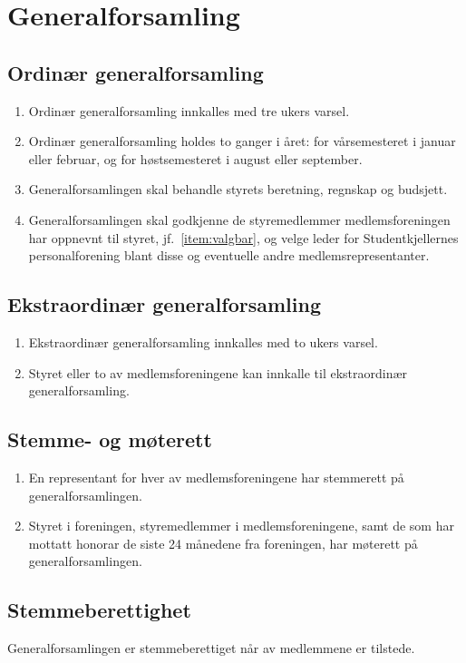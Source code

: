 \documentclass[11pt,norsk,a4paper]{article}
\begin{document}
\section{Generalforsamling}

\subsection{Ordinær generalforsamling}
\begin{enumerate}
	\item Ordinær generalforsamling innkalles med tre ukers varsel. 
	\item Ordinær generalforsamling holdes to ganger i året: for vårsemesteret i januar eller februar, og for høstsemesteret i august eller september.
	\item Generalforsamlingen skal behandle styrets beretning, regnskap og budsjett. 
	\item Generalforsamlingen skal godkjenne de styremedlemmer medlemsforeningen 
		har oppnevnt til styret, jf.~\ref{item:valgbar}, 
		og velge leder for Studentkjellernes personalforening blant disse og eventuelle andre medlemsrepresentanter.
\end{enumerate}

\subsection{Ekstraordinær generalforsamling}
\begin{enumerate}
	\item Ekstraordinær generalforsamling innkalles med to ukers varsel. 
	\item Styret eller to av medlemsforeningene kan innkalle til ekstraordinær generalforsamling.
\end{enumerate}

\subsection{Stemme- og møterett}
\begin{enumerate}
	\item En representant for hver av medlemsforeningene har stemmerett på generalforsamlingen.
	\item Styret i foreningen, styremedlemmer i medlemsforeningene,
samt de som har mottatt honorar de siste 24 månedene fra foreningen, har møterett på
generalforsamlingen.
\end{enumerate}

\subsection{Stemmeberettighet}
Generalforsamlingen er stemmeberettiget når  av medlemmene er tilstede.
\end{document}
